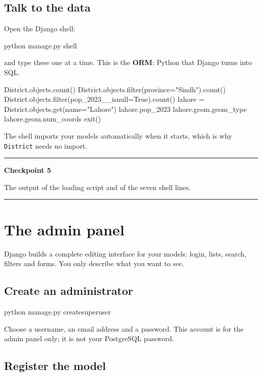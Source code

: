 \documentclass{article}
\newcommand{\cd}[1]{\texttt{#1}}
\newenvironment{keypoint}[1]
  {\par\vspace{.7em}\noindent\rule{\linewidth}{.6pt}\par\vspace{.15em}
   \noindent\textbf{#1}\par\nobreak\vspace{-.3em}}
  {\par\vspace{.15em}\noindent\rule{\linewidth}{.6pt}\par\vspace{.7em}}
\begin{document}
\subsection{Talk to the data}

Open the Django shell:

\begin{code}
python manage.py shell
\end{code}

and type these one at a time. This is the \textbf{ORM}: Python that
Django turns into SQL.

\begin{code}
District.objects.count()
District.objects.filter(province="Sindh").count()
District.objects.filter(pop_2023__isnull=True).count()
lahore = District.objects.get(name="Lahore")
lahore.pop_2023
lahore.geom.geom_type
lahore.geom.num_coords
exit()
\end{code}

The shell imports your models automatically when it starts, which is why
\cd{District} needs no import.

\begin{keypoint}{Checkpoint 5}
The output of the loading script and of the seven shell lines.
\end{keypoint}


\section{The admin panel}

Django builds a complete editing interface for your models: login,
lists, search, filters and forms. You only describe what you want to see.

\subsection{Create an administrator}

\begin{code}
python manage.py createsuperuser
\end{code}

Choose a username, an email address and a password. This account is for
the admin panel only; it is not your PostgreSQL password.

\subsection{Register the model}
\end{document}
